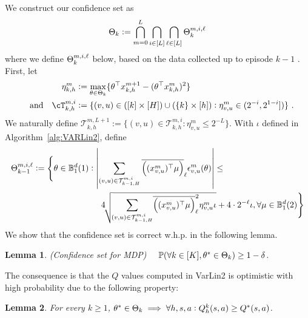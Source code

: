 \documentclass{article}
\newtheorem{lemma}{Lemma}
\def\BB{\mathbb{B}}
\def\clip#1{\wbar{\del{#1}}}
\newcommand{\blue}[1]{{\color[rgb]{.3,.5,1}#1}}
\renewcommand{\blue}[1]{#1}
\begin{document}
We construct our confidence set as 
\begin{align}\label{eq:varlin2conf-0}
  {{\Theta}}_k := \bigcap_{m=0}^{L} \bigcap_{i\in[L]} \bigcap_{\ell\in[L]} {{\Theta}}_k^{m,i,\ell}
\end{align}
where we define ${{\Theta}}_k^{m,i,\ell}$ below, based on the data collected up to episode $k-1$ .
First, let
\begin{align*}
    \blue{\eta_{k,h}^m} &:=\max_{\th \in \Theta_{k}} \{\th^\T x_{k,h}^{m+1} - (\th^\T x_{k,h}^m)^2\} 
\\ \text{~~ and ~~} \blue{\cT_{k,h}^{m,i}} &:= \{(v,u)\in ([k]\times[H]) \cup (\{k\}\times[h]): 
   \eta_{v,u}^m \in ( 2^{-i},2^{1-i}])\}~.
\end{align*}
We naturally define 
$\blue{\mathcal{T}_{k,h}^{m,L+1}}:=\{(v,u)\in \mathcal{T}_{k,h}^{m,i}: \eta_{v,u}^m \le 2^{-L}\}$.
With $\iota$ defined in Algorithm~\ref{alg:VARLin2}, define 
\begin{align} %
  \blue{\Theta^{m,i,\ell}_{k-1}} %
  &:= \Bigg\{\th \in \BB_1^d(1): \lt|\sum_{(v,u)\in \mathcal{T}_{k-1,H}^{m,i}} \clip{(x_{v,u}^m)^\T \mu }_\ell \eps_{v,u}^{m}(\th)\rt|\le \notag
\\  &\hspace{80pt} 4\!\sqrt{\!\sum_{(v,u)\in \mathcal{T}_{k-1,H}^{m,i}}\! \clip{(x_{v,u}^m)^\T\mu }_\ell^2 \eta_{v,u}^m \iota } +  4 \cdot 2^{-\ell}\iota , \forall \mu\in \BB_1^d(2)  \Bigg\} 
\end{align}
We show that the confidence set is correct w.h.p. in the following lemma.
\begin{lemma}\label{lem:confset-rl}
 (Confidence set for MDP)~~
  $
    \operatorname{\mathbb{P}}(\forall k\in[K], {\theta}^* \in  \Theta_k ) \ge 1-{\delta}
  $.
\end{lemma}
The consequence is that the $Q$ values computed in VarLin2 is optimistic with high probability due to the following property:
\begin{lemma} \label{lem:optimism}
For every $k \ge1$, 
$
{\theta}^*\in \Theta_k \implies \forall h,s,a:Q_h^k(s,a)\ge Q^*(s,a)
$.
\end{lemma}
\end{document}
